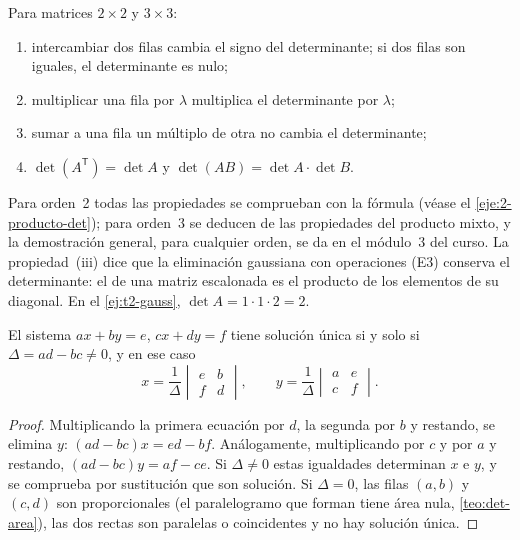 \begin{proposicion}\label{prop:det-propiedades}
Para matrices $2\times2$ y $3\times3$:
\begin{enumerate}
  \item intercambiar dos filas cambia el signo del determinante; si dos filas son iguales, el determinante es nulo;
  \item multiplicar una fila por $\lambda$ multiplica el determinante por $\lambda$;
  \item sumar a una fila un múltiplo de otra no cambia el determinante;
  \item $\det(A^{\mathsf T})=\det A$ y $\det(AB)=\det A\cdot\det B$.
\end{enumerate}
\end{proposicion}

Para orden~2 todas las propiedades se comprueban con la fórmula (véase el \cref{eje:2-producto-det}); para orden~3 se deducen de las propiedades del producto mixto, y la demostración general, para cualquier orden, se da en el módulo~3 del curso. La propiedad~(iii) dice que la eliminación gaussiana con operaciones (E3) conserva el determinante: el de una matriz escalonada es el producto de los elementos de su diagonal. En el \cref{ej:t2-gauss}, $\det A=1\cdot1\cdot2=2$.

\begin{teorema}\label{teo:cramer}
El sistema $ax+by=e$, $cx+dy=f$ tiene solución única si y solo si $\Delta=ad-bc\neq0$, y en ese caso
\[
x=\frac{1}{\Delta}\begin{vmatrix}e&b\\f&d\end{vmatrix},\qquad y=\frac{1}{\Delta}\begin{vmatrix}a&e\\c&f\end{vmatrix}.
\]
\end{teorema}

\begin{proof}
Multiplicando la primera ecuación por $d$, la segunda por $b$ y restando, se elimina $y$: $(ad-bc)x=ed-bf$. Análogamente, multiplicando por $c$ y por $a$ y restando, $(ad-bc)y=af-ce$. Si $\Delta\neq0$ estas igualdades determinan $x$ e $y$, y se comprueba por sustitución que son solución. Si $\Delta=0$, las filas $(a,b)$ y $(c,d)$ son proporcionales (el paralelogramo que forman tiene área nula, \cref{teo:det-area}), las dos rectas son paralelas o coincidentes y no hay solución única.
\end{proof}

